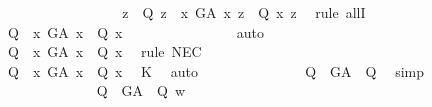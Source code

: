 \begin{isabellebody}
\ \ \ \ \isanewline
\ \ \ \ \ \ \ \ \ \ \ \ \isamarkupfalse%
\ {\isachardoublequoteopen}{\isasymforall}z{\isachardot}\ {\isacharparenleft}{\isasymP}\ Q\ z{\isacharparenright}\ {\isasymlongrightarrow}\ {\isacharparenleft}{\isasymforall}x{\isachardot}\ G\isactrlsup A\ x\ z\ {\isasymlongrightarrow}\ Q\ x\ z{\isacharparenright}{\isachardoublequoteclose}\ \isamarkupfalse%
\ {\isacharparenleft}rule\ allI{\isacharparenright}\isanewline
\ \ \ \ \ \ \ \ \ \ \ \ \isamarkupfalse%
\ {\isachardoublequoteopen}{\isasymlfloor}{\isasymP}\ Q\ \isactrlbold {\isasymrightarrow}\ {\isacharparenleft}\isactrlbold {\isasymforall}x{\isachardot}\ G\isactrlsup A\ x\ \isactrlbold {\isasymrightarrow}\ Q\ x{\isacharparenright}{\isasymrfloor}{\isachardoublequoteclose}\isanewline
\ \ \ \ \ \ \ \ \ \ \ \ \ \ \isamarkupfalse%
\ auto\ %
\isanewline
\ \ \ \ \ \ \ \ \ \ \ \ \isamarkupfalse%
\ {\isachardoublequoteopen}{\isasymlfloor}\isactrlbold {\isasymbox}{\isacharparenleft}{\isasymP}\ Q\ \isactrlbold {\isasymrightarrow}\ {\isacharparenleft}\isactrlbold {\isasymforall}x{\isachardot}\ G\isactrlsup A\ x\ \isactrlbold {\isasymrightarrow}\ Q\ x{\isacharparenright}{\isacharparenright}{\isasymrfloor}{\isachardoublequoteclose}\ \isamarkupfalse%
\ {\isacharparenleft}rule\ NEC{\isacharparenright}\ \isanewline
\ \ \ \ \ \ \ \ \ \ \ \ \isanewline
\ \ \ \ \ \ \ \ \ \ \ \ \isamarkupfalse%
\ {\isachardoublequoteopen}{\isasymlfloor}{\isacharparenleft}\isactrlbold {\isasymbox}{\isacharparenleft}{\isasymP}\ Q{\isacharparenright}{\isacharparenright}\ \isactrlbold {\isasymrightarrow}\ \isactrlbold {\isasymbox}{\isacharparenleft}\isactrlbold {\isasymforall}x{\isachardot}\ G\isactrlsup A\ x\ \isactrlbold {\isasymrightarrow}\ Q\ x{\isacharparenright}{\isasymrfloor}{\isachardoublequoteclose}\ \isamarkupfalse%
\ K\ \isamarkupfalse%
\ auto\isanewline
\ \ \ \ \ \ \ \ \ \ \ \ \isamarkupfalse%
\ {\isachardoublequoteopen}{\isasymlfloor}{\isacharparenleft}\isactrlbold {\isasymbox}{\isacharparenleft}{\isasymP}\ Q{\isacharparenright}{\isacharparenright}\ \isactrlbold {\isasymrightarrow}\ G\isactrlsup A\ {\isasymRrightarrow}\ Q{\isasymrfloor}{\isachardoublequoteclose}\ \isamarkupfalse%
\ simp\isanewline
\ \ \ \ \ \ \ \ \ \ \ \ \isamarkupfalse%
\ {\isachardoublequoteopen}{\isacharparenleft}{\isacharparenleft}\isactrlbold {\isasymbox}{\isacharparenleft}{\isasymP}\ Q{\isacharparenright}{\isacharparenright}\ \isactrlbold {\isasymrightarrow}\ G\isactrlsup A\ {\isasymRrightarrow}\ Q{\isacharparenright}\ w{\isachardoublequoteclose}\ \isamarkupfalse%

\end{isabellebody}
